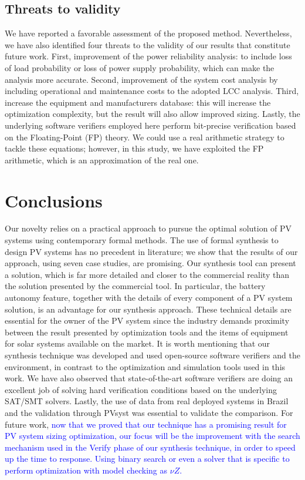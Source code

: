 \documentclass[runningheads]{llncs}
\begin{document}
\subsection{Threats to validity} 
We have reported a favorable assessment of the proposed method. Nevertheless, we have also identified four threats to the validity of our results that constitute future work. First, improvement of the power reliability analysis: to include loss of load probability or loss of power supply probability, which can make the analysis more accurate. Second, improvement of the system cost analysis by including operational and maintenance costs to the adopted LCC analysis. Third, increase the equipment and manufacturers database: this will increase the optimization complexity, but the result will also allow improved sizing. Lastly, the underlying software verifiers employed here perform bit-precise verification based on the Floating-Point (FP) theory. We could use a real arithmetic strategy to tackle these equations; however, in this study, we have exploited the FP arithmetic, which is an approximation of the real one. 
\section{Conclusions} 
Our novelty relies on a practical approach to pursue the optimal solution of PV systems using contemporary formal methods. The use of formal synthesis to design PV systems has no precedent in literature; we show that the results of our approach, using seven case studies, are promising. Our synthesis tool can present a solution, which is far more detailed and closer to the commercial reality than the solution presented by the commercial tool. In particular, the battery autonomy feature, together with the details of every component of a PV system solution, is an advantage for our synthesis approach. These technical details are essential for the owner of the PV system since the industry demands proximity between the result presented by optimization tools and the items of equipment for solar systems available on the market. It is worth mentioning that our synthesis technique was developed and used open-source software verifiers and the environment, in contrast to the optimization and simulation tools used in this work. We have also observed that state-of-the-art software verifiers are doing an excellent job of solving hard verification conditions based on the underlying SAT/SMT solvers. Lastly, the use of data from real deployed systems in Brazil and the validation through PVsyst was essential to validate the comparison. For future work, %
\textcolor{blue}{now that we proved that our technique has a promising result for PV system sizing optimization, our focus will be the improvement with the search mechanism used in the {\sc Verify} phase of our synthesis technique, in order to speed up the time to response. Using binary search or even a solver that is specific to perform optimization with model checking as $\nu Z$.}

%
%


%
\end{document}
